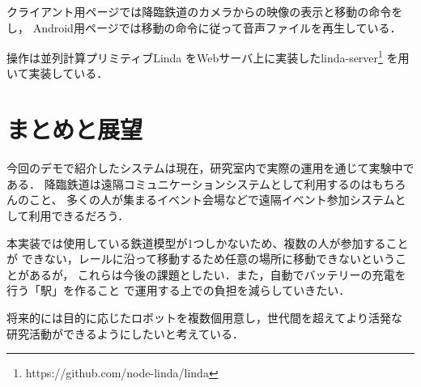\documentclass[submit,techreq]{ipsj}
\begin{document}
クライアント用ページでは降臨鉄道のカメラからの映像の表示と移動の命令をし，
Android用ページでは移動の命令に従って音声ファイルを再生している．

操作は並列計算プリミティブLinda\cite{Carriero:1989:LC:63334.63337}
をWebサーバ上に実装したlinda-server\footnote{
  \textsf{https://github.com/node-linda/linda}
}
を用いて実装している．

\section{まとめと展望}

今回のデモで紹介したシステムは現在，研究室内で実際の運用を通じて実験中である．
降臨鉄道は遠隔コミュニケーションシステムとして利用するのはもちろんのこと、
多くの人が集まるイベント会場などで遠隔イベント参加システムとして利用できるだろう．

本実装では使用している鉄道模型が1つしかないため、複数の人が参加することが
できない，レールに沿って移動するため任意の場所に移動できないということがあるが，
これらは今後の課題としたい．また，自動でバッテリーの充電を行う「駅」を作ること
で運用する上での負担を減らしていきたい．

将来的には目的に応じたロボットを複数個用意し，世代間を超えてより活発な
研究活動ができるようにしたいと考えている．

{\scriptsize


}
\end{document}
